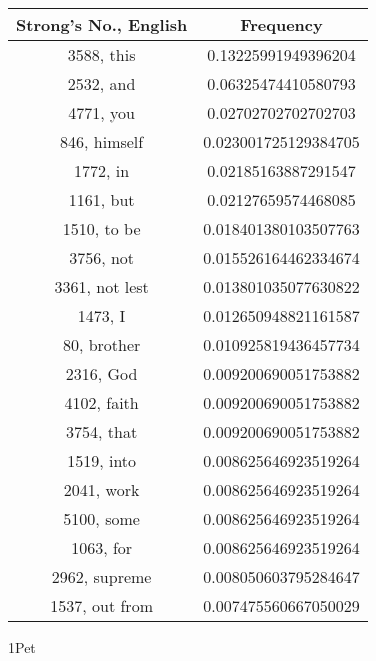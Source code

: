 \documentclass[12pt,letterpaper]{article}
\begin{document}
 \begin{longtable}{|c|c|}
\hline
 Strong's No., English & Frequency \\ \hline  
3588, this & 0.13225991949396204\\ \hline 
 2532, and & 0.06325474410580793\\ \hline 
 4771, you & 0.02702702702702703\\ \hline 
 846, himself & 0.023001725129384705\\ \hline 
 1772, in & 0.02185163887291547\\ \hline 
 1161, but & 0.02127659574468085\\ \hline 
 1510, to be & 0.018401380103507763\\ \hline 
 3756, not & 0.015526164462334674\\ \hline 
 3361, not lest & 0.013801035077630822\\ \hline 
 1473, I & 0.012650948821161587\\ \hline 
 80, brother & 0.010925819436457734\\ \hline 
 2316, God & 0.009200690051753882\\ \hline 
 4102, faith & 0.009200690051753882\\ \hline 
 3754, that & 0.009200690051753882\\ \hline 
 1519, into & 0.008625646923519264\\ \hline 
 2041, work & 0.008625646923519264\\ \hline 
 5100, some & 0.008625646923519264\\ \hline 
 1063, for & 0.008625646923519264\\ \hline 
 2962, supreme & 0.008050603795284647\\ \hline 
 1537, out from & 0.007475560667050029\\ \hline 
\end{longtable} 
 

1Pet
\end{document}
